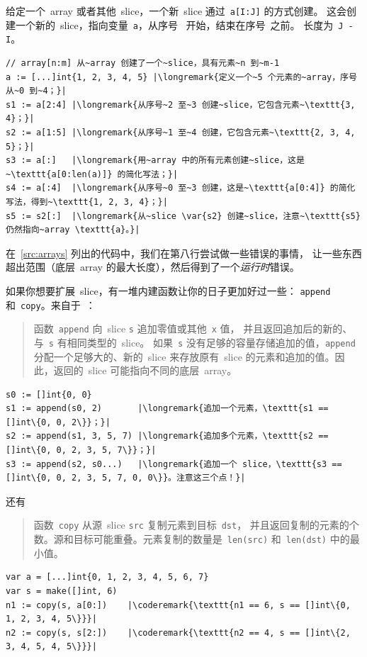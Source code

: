 给定一个~array 或者其他~slice，一个新~slice 通过~\lstinline{a[I:J]}
的方式创建。
这会创建一个新的~slice，指向变量~\lstinline{a}，从序号~ 开始，结束在序号~之前。
长度为~\lstinline{J - I}。

\begin{lstlisting}
// array[n:m] 从~array 创建了一个~slice，具有元素~n 到~m-1
a := [...]int{1, 2, 3, 4, 5} |\longremark{定义一个~5 个元素的~array，序号从~0 到~4；}|
s1 := a[2:4] |\longremark{从序号~2 至~3 创建~slice，它包含元素~\texttt{3, 4}；}|
s2 := a[1:5] |\longremark{从序号~1 至~4 创建，它包含元素~\texttt{2, 3, 4, 5}；}|
s3 := a[:]   |\longremark{用~array 中的所有元素创建~slice，这是~\texttt{a[0:len(a)]} 的简化写法；}|
s4 := a[:4]  |\longremark{从序号~0 至~3 创建，这是~\texttt{a[0:4]} 的简化写法，得到~\texttt{1, 2, 3, 4}；}|
s5 := s2[:]  |\longremark{从~slice \var{s2} 创建~slice，注意~\texttt{s5} 仍然指向~array \texttt{a}。}|
\end{lstlisting}
\showremarks

在~\ref{src:arrays} 列出的代码中，我们在第八行尝试做一些错误的事情，
让一些东西超出范围（底层~array 的最大长度），然后得到了一个\emph{运行时}错误。

如果你想要扩展~slice，有一堆内建函数让你的日子更加好过一些：
\lstinline{append} 和~\lstinline{copy}。来自于~\cite{go_spec}：
\begin{quote}
函数~\lstinline{append} 向~slice \lstinline{s} 追加零值或其他~\lstinline{x} 值，
并且返回追加后的新的、与~\lstinline{s} 有相同类型的~slice。
如果~\lstinline{s} 没有足够的容量存储追加的值，\lstinline{append} 分配一个足够大的、新的~slice
来存放原有~slice 的元素和追加的值。因此，返回的~slice 可能指向不同的底层~array。
\end{quote}
\begin{lstlisting}
s0 := []int{0, 0}
s1 := append(s0, 2)       |\longremark{追加一个元素，\texttt{s1 == []int\{0, 0, 2\}}；}|
s2 := append(s1, 3, 5, 7) |\longremark{追加多个元素，\texttt{s2 == []int\{0, 0, 2, 3, 5, 7\}}；}|
s3 := append(s2, s0...)   |\longremark{追加一个 slice，\texttt{s3 == []int\{0, 0, 2, 3, 5, 7, 0, 0\}}。注意这三个点！}|
\end{lstlisting}
\showremarks
还有
\begin{quote}
函数~\lstinline{copy} 从源~slice \lstinline{src} 复制元素到目标~\lstinline{dst}，
并且返回复制的元素的个数。源和目标可能重叠。元素复制的数量是~\lstinline{len(src)} 
和~\mbox{\lstinline{len(dst)}} 中的最小值。
\end{quote}
\begin{lstlisting}
var a = [...]int{0, 1, 2, 3, 4, 5, 6, 7}
var s = make([]int, 6)
n1 := copy(s, a[0:])    |\coderemark{\texttt{n1 == 6, s == []int\{0, 1, 2, 3, 4, 5\}}}|
n2 := copy(s, s[2:])    |\coderemark{\texttt{n2 == 4, s == []int\{2, 3, 4, 5, 4, 5\}}}|
\end{lstlisting}

